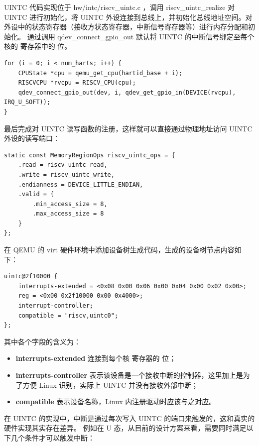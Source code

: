 UINTC 代码实现位于 hw/intc/riscv\_uintc.c ，调用 riscv\_uintc\_realize 对 UINTC 进行初始化，将 UINTC 外设连接到总线上，并初始化总线地址空间。对外设中的状态寄存器（接收方状态寄存器，中断信号寄存器等）进行内存分配和初始化。
通过调用 qdev\_connect\_gpio\_out 默认将 UINTC 的中断信号绑定至每个核的 \Ruip 寄存器中的 \FcsrUipUsip 位。

\begin{lstlisting}[style=CStyle]
for (i = 0; i < num_harts; i++) {
    CPUState *cpu = qemu_get_cpu(hartid_base + i);
    RISCVCPU *rvcpu = RISCV_CPU(cpu);
    qdev_connect_gpio_out(dev, i, qdev_get_gpio_in(DEVICE(rvcpu), IRQ_U_SOFT));
}
\end{lstlisting}

最后完成对 UINTC 读写函数的注册，这样就可以直接通过物理地址访问 UINTC 外设的读写端口：

\begin{lstlisting}[style=CStyle]
static const MemoryRegionOps riscv_uintc_ops = {
    .read = riscv_uintc_read,
    .write = riscv_uintc_write,
    .endianness = DEVICE_LITTLE_ENDIAN,
    .valid = {
        .min_access_size = 8,
        .max_access_size = 8
    }
};
\end{lstlisting}

在 QEMU 的 virt 硬件环境中添加设备树生成代码，生成的设备树节点内容如下：

\lstset{basicstyle=\footnotesize\tt}
\begin{lstlisting}
uintc@2f10000 {
    interrupts-extended = <0x08 0x00 0x06 0x00 0x04 0x00 0x02 0x00>;
    reg = <0x00 0x2f10000 0x00 0x4000>;
    interrupt-controller;
    compatible = "riscv,uintc0";
};
\end{lstlisting}

其中各个字段的含义为：

\begin{itemize}
    \item \textbf{interrupts-extended} 连接到每个核 \Ruip 寄存器的 \FcsrUipUsip 位；
    \item \textbf{interrupts-controller} 表示该设备是一个接收中断的控制器，这里加上是为了方便 Linux 识别，实际上 UINTC 并没有接收外部中断；
    \item \textbf{compatible} 表示设备名称，Linux 内注册驱动时应该与之对应。
\end{itemize}

在 UINTC 的实现中，中断是通过每次写入 UINTC 的端口来触发的，这和真实的硬件实现其实存在差异。
例如在 U 态，从目前的设计方案来看，需要同时满足以下几个条件才可以触发中断：

